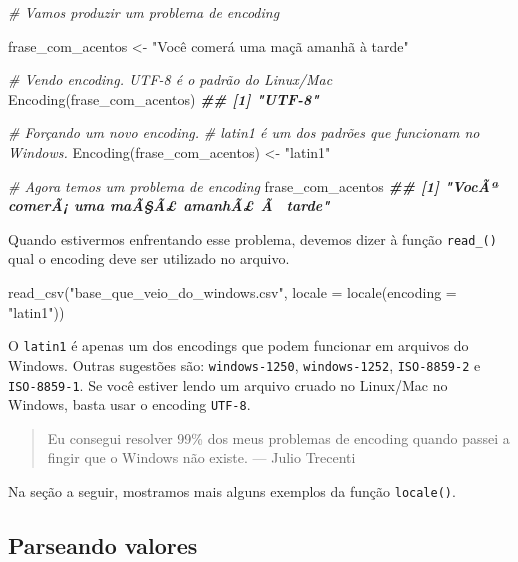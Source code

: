\documentclass[
]{book}
\newenvironment{Shaded}{\begin{snugshade}}{\end{snugshade}}
\newcommand{\AttributeTok}[1]{\textcolor[rgb]{0.77,0.63,0.00}{#1}}
\newcommand{\CommentTok}[1]{\textcolor[rgb]{0.56,0.35,0.01}{\textit{#1}}}
\newcommand{\DocumentationTok}[1]{\textcolor[rgb]{0.56,0.35,0.01}{\textbf{\textit{#1}}}}
\newcommand{\FunctionTok}[1]{\textcolor[rgb]{0.00,0.00,0.00}{#1}}
\newcommand{\NormalTok}[1]{#1}
\newcommand{\OtherTok}[1]{\textcolor[rgb]{0.56,0.35,0.01}{#1}}
\newcommand{\StringTok}[1]{\textcolor[rgb]{0.31,0.60,0.02}{#1}}
\begin{document}
\begin{Shaded}
\begin{Highlighting}[]
\CommentTok{\# Vamos produzir um problema de encoding}

\NormalTok{frase\_com\_acentos }\OtherTok{\textless{}{-}} \StringTok{"Você comerá uma maçã amanhã à tarde"}

\CommentTok{\# Vendo encoding. UTF{-}8 é o padrão do Linux/Mac}
\FunctionTok{Encoding}\NormalTok{(frase\_com\_acentos)}
\DocumentationTok{\#\# [1] "UTF{-}8"}

\CommentTok{\# Forçando um novo encoding. }
\CommentTok{\# latin1 é um dos padrões que funcionam no Windows.}
\FunctionTok{Encoding}\NormalTok{(frase\_com\_acentos) }\OtherTok{\textless{}{-}}  \StringTok{"latin1"}

\CommentTok{\# Agora temos um problema de encoding}
\NormalTok{frase\_com\_acentos}
\DocumentationTok{\#\# [1] "VocÃª comerÃ¡ uma maÃ§Ã£ amanhÃ£ Ã  tarde"}
\end{Highlighting}
\end{Shaded}

Quando estivermos enfrentando esse problema, devemos dizer à função \texttt{read\_()} qual o encoding deve ser utilizado no arquivo.

\begin{Shaded}
\begin{Highlighting}[]
\FunctionTok{read\_csv}\NormalTok{(}\StringTok{"base\_que\_veio\_do\_windows.csv"}\NormalTok{, }\AttributeTok{locale =} \FunctionTok{locale}\NormalTok{(}\AttributeTok{encoding =} \StringTok{"latin1"}\NormalTok{))}
\end{Highlighting}
\end{Shaded}

O \texttt{latin1} é apenas um dos encodings que podem funcionar em arquivos do Windows. Outras sugestões são: \texttt{windows-1250}, \texttt{windows-1252}, \texttt{ISO-8859-2} e \texttt{ISO-8859-1}. Se você estiver lendo um arquivo cruado no Linux/Mac no Windows, basta usar o encoding \texttt{UTF-8}.

\begin{quote}
Eu consegui resolver 99\% dos meus problemas de encoding quando passei a fingir que o Windows não existe. --- Julio Trecenti
\end{quote}

Na seção a seguir, mostramos mais alguns exemplos da função \texttt{locale()}.

\hypertarget{parseando-valores}{%
\subsection{Parseando valores}\label{parseando-valores}}
\end{document}
